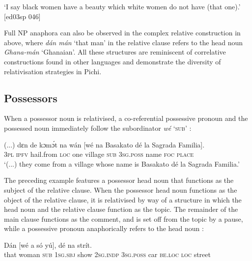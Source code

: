 \glt ‘I say black women have a beauty which white women do not 
have (that one).’ [ed03sp 046]
\z

Full \textsc{NP} anaphora can also be observed in the complex relative construction in  above, where \textit{dán mán} ‘that man’ in the relative clause refers to the head noun \textit{Ghana-mán} ‘Ghanaian’. All these structures are reminiscent of correlative constructions found in other languages and demonstrate the diversity of relativisation strategies in Pichi.

\subsection{Possessors}

When a possessor noun is relativised, a co-referential possessive pronoun and the possessed noun immediately follow the subordinator \textit{wé} ‘\textsc{sub}’ :


\ea%
    \label{ex:key:1447}
\gll
(...)  dɛn  de  kɔmɔ́t    na  wán      [wé          na
{Basakato   dé la Sagrada Familia}].\\
{} \textsc{3pl}  \textsc{ipfv}  hail.from  \textsc{loc}  one    village   \textsc{sub}    \textsc{3sg.poss}  name  \textsc{foc}
\textsc{place}\\

\glt ‘(...) they come from a village whose name is Basakato dé la Sagrada 
Familia.’\textstylePichiglossZchn{ [fr03ft 042]}
\z

The preceding example features a possessor head noun that functions as the subject of the relative clause. When the possessor head noun functions as the object of the relative clause, it is relativised by way of a structure in which the head noun and the relative clause function as the topic. The remainder of the main clause functions as the comment, and is set off from the topic by a pause, while a possessive pronoun anaphorically refers to the head noun :


\ea%
    \label{ex:key:1448}
    \gll Dán    [wé  a    só    yú],            dé    na  strít.\\
that  woman   \textsc{sub}  \textsc{1sg.sbj}  show  \textsc{2sg.indp}  \textsc{3sg.poss}    car    \textsc{be.loc}  \textsc{loc}  street\\

